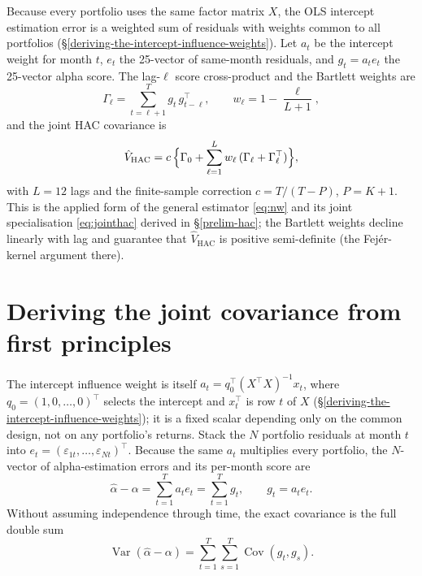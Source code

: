 Because every portfolio uses the same factor matrix $X$, the OLS intercept
estimation error is a weighted sum of residuals with weights common to all
portfolios (\S\ref{deriving-the-intercept-influence-weights}). Let $a_t$ be
the intercept weight for month $t$, $e_t$ the 25-vector of same-month
residuals, and $g_t=a_t e_t$ the 25-vector alpha score. The lag-$\ell$
score cross-product and the Bartlett weights are
\begin{equation}\label{eq:ch6-gamma}
\Gamma_\ell = \sum_{t=\ell+1}^{T} g_t\,g_{t-\ell}^{\top},
\qquad w_\ell = 1 - \frac{\ell}{L+1},
\end{equation}
and the joint HAC covariance is
\begin{equation}\label{eq:ch6-vhac}
\hat V_{\mathrm{HAC}} = c\,\Bigl\{\Gamma_0
+ \sum_{\ell=1}^{L} w_\ell\,(\Gamma_\ell + \Gamma_\ell^{\top})\Bigr\},
\end{equation}
with $L=12$ lags and the finite-sample correction $c=T/(T-P)$, $P=K+1$.
This is the applied form of the general estimator \eqref{eq:nw} and its
joint specialisation \eqref{eq:jointhac} derived in \S\ref{prelim-hac}; the
Bartlett weights decline linearly with lag and guarantee that
$\hat V_{\mathrm{HAC}}$ is positive semi-definite (the Fej\'er-kernel
argument there).

\hypertarget{deriving-the-joint-covariance-from-first-principles}{%
\section{Deriving the joint covariance from first
principles}\label{deriving-the-joint-covariance-from-first-principles}}

The intercept influence weight is itself
$a_t = q_0^{\top}(X^{\top}X)^{-1}x_t$, where $q_0=(1,0,\dots,0)^{\top}$
selects the intercept and $x_t^{\top}$ is row $t$ of $X$
(\S\ref{deriving-the-intercept-influence-weights}); it is a fixed scalar
depending only on the common design, not on any portfolio's returns. Stack
the $N$ portfolio residuals at month $t$ into
$e_t=(\varepsilon_{1t},\dots,\varepsilon_{Nt})^{\top}$. Because the same
$a_t$ multiplies every portfolio, the $N$-vector of alpha-estimation errors
and its per-month score are
\begin{equation}\label{eq:ch6-alphaerr}
\hat\alpha-\alpha = \sum_{t=1}^{T} a_t e_t = \sum_{t=1}^{T} g_t,
\qquad g_t = a_t e_t .
\end{equation}
Without assuming independence through time, the exact covariance is the
full double sum
\begin{equation}\label{eq:ch6-doublesum}
\operatorname{Var}(\hat\alpha-\alpha)
= \sum_{t=1}^{T}\sum_{s=1}^{T}\operatorname{Cov}(g_t,g_s).
\end{equation}

